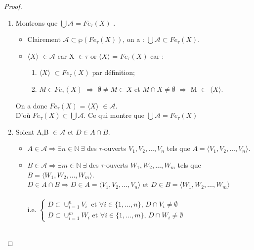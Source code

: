 \documentclass[11pt]{report}
\theoremstyle{styletheorem}
\theoremstyle{styledef}
\theoremstyle{remark}
\begin{document}
\begin{proof}
	\begin{enumerate}
		\item Montrons que $ \bigcup \mathcal{A} = Fe_{\tau}(X)$   .
		\begin{itemize}
			\item Clairement $ \mathcal{A} \subset \wp(Fe_{\tau}(X)) $, on a : $ \bigcup \mathcal{A} \subset Fe_{\tau}(X)$.
			\item $\langle X \rangle$ $ \in \mathcal{A} $ car X $ \in \tau$ or $\langle X \rangle$ = $ Fe_{\tau}(X) $ car : 
			\begin{enumerate}[label=(\roman*)]
				\item $\langle X \rangle$ $ \subset Fe_{\tau}(X) $ par définition;
				\item $ M \in Fe_{\tau}(X)$ $\Rightarrow $ $\emptyset \neq M \subset X $ et $ M \cap X \neq \emptyset $ $\Rightarrow$ M $ \in $  $\langle X \rangle$.
			\end{enumerate}
		\end{itemize} 
		On a donc $ Fe_{\tau}(X) $ =  $\langle X \rangle$ $ \in \mathcal{A} $. \\
		D'où $ Fe_{\tau}(X) \subset \bigcup \mathcal{A} $. Ce qui montre que $ \bigcup \mathcal{A} =  Fe_{\tau}(X)  $
		\item Soient A,B $ \in \mathcal{A} $ et  $ D \in A \cap B $.
		\begin{itemize}
			\item  $ A \in \mathcal{A} \Rightarrow \exists n \in \mathbb{N} \ \exists$ des $ \tau $-ouverts $ V_1,V_2,\dots, V_n  $ tels que $ A = \langle  V_1,V_2, \dots , V_n \rangle  $.
			\item $ B \in \mathcal{A} \Rightarrow \exists m \in \mathbb{N} \ \exists$ des $ \tau $-ouverts $ W_1,W_2,\dots, W_m  $ tels que $B = \langle W_1,W_2, \dots , W_m \rangle $.\\
			$D \in A \cap B \Rightarrow D \in A = \langle V_1,V_2, \dots , V_n \rangle $ et $D \in B = \langle W_1,W_2, \dots , W_m \rangle  $\\ \\ i.e. $\left\lbrace 
			\begin{array}{ll}
				D \subset \cup_{i=1}^{n} V_i \ \mbox{ et } \forall i \in \lbrace 1,\dots,n \rbrace \mbox{, } D \cap V_i \neq \emptyset\\
				D \subset \cup_{i=1}^{m} W_i \mbox{ et } \forall i \in \lbrace 1, \dots ,m \rbrace \mbox{, } D \cap W_i \neq \emptyset
			\end{array}  
			\right.$ \\ \ \\

\end{itemize}
\end{enumerate}
\end{proof}
\end{document}
